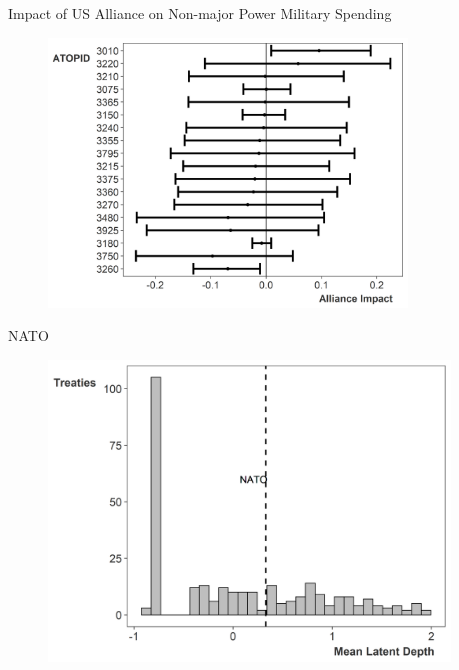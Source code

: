 \documentclass[12pt]{beamer}
\begin{document}

\begin{frame}{Impact of US Alliance on Non-major Power Military Spending} 

\begin{figure}
	\centering
		\includegraphics[width=0.85\textwidth]{lambda-us-min.png}
\end{figure}


\end{frame}


\begin{frame}{NATO} 

\begin{figure}
	\centering
		\includegraphics[width=0.95\textwidth]{ld-hist-nato.png}
\end{figure}


 \end{frame}
\end{document}
